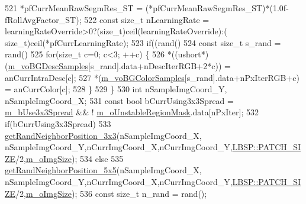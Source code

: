 \begin{DoxyCode}
521                 *pfCurrMeanRawSegmRes\_ST = (*pfCurrMeanRawSegmRes\_ST)*(1.0f-fRollAvgFactor\_ST);
522                 \textcolor{keyword}{const} \textcolor{keywordtype}{size\_t} nLearningRate = learningRateOverride>0?(size\_t)ceil(learningRateOverride):(
      size\_t)ceil(*pfCurrLearningRate);
523                 \textcolor{keywordflow}{if}((rand()%
524                     \textcolor{keyword}{const} \textcolor{keywordtype}{size\_t} s\_rand = rand()%
525                     \textcolor{keywordflow}{for}(\textcolor{keywordtype}{size\_t} c=0; c<3; ++c) \{
526                         *((ushort*)(\mbox{\hyperlink{class_background_subtractor_su_b_s_e_n_s_e_a422cc2f2a25c07efca02087bd6fe3d6d}{m\_voBGDescSamples}}[s\_rand].data+nDescIterRGB+2*c)) = 
      anCurrIntraDesc[c];
527                         *(\mbox{\hyperlink{class_background_subtractor_su_b_s_e_n_s_e_a9d4d4bb930b34745536b9862683bb539}{m\_voBGColorSamples}}[s\_rand].data+nPxIterRGB+c) = anCurrColor[c];
528                     \}
529                 \}
530                 \textcolor{keywordtype}{int} nSampleImgCoord\_Y, nSampleImgCoord\_X;
531                 \textcolor{keyword}{const} \textcolor{keywordtype}{bool} bCurrUsing3x3Spread = \mbox{\hyperlink{class_background_subtractor_su_b_s_e_n_s_e_a1e2e28840e7ca373282607db81b49e12}{m\_bUse3x3Spread}} && !
      \mbox{\hyperlink{class_background_subtractor_su_b_s_e_n_s_e_acfaf4c3c5aedbed8bd302444b4a4f8dd}{m\_oUnstableRegionMask}}.data[nPxIter];
532                 \textcolor{keywordflow}{if}(bCurrUsing3x3Spread)
533                     \mbox{\hyperlink{_rand_utils_8h_a76b18bef397ed044a6db9e3a63c69f69}{getRandNeighborPosition\_3x3}}(nSampleImgCoord\_X,
      nSampleImgCoord\_Y,nCurrImgCoord\_X,nCurrImgCoord\_Y,\mbox{\hyperlink{class_l_b_s_p_aa98abb79a155d3a2b416c2ab32e74929}{LBSP::PATCH\_SIZE}}/2,\mbox{\hyperlink{class_background_subtractor_l_b_s_p_a732d5e6ae35fb0e858cadb3af5ce08a2}{m\_oImgSize}});
534                 \textcolor{keywordflow}{else}
535                     \mbox{\hyperlink{_rand_utils_8h_adb1e7788e9dbe8cfde588761e96126c1}{getRandNeighborPosition\_5x5}}(nSampleImgCoord\_X,
      nSampleImgCoord\_Y,nCurrImgCoord\_X,nCurrImgCoord\_Y,\mbox{\hyperlink{class_l_b_s_p_aa98abb79a155d3a2b416c2ab32e74929}{LBSP::PATCH\_SIZE}}/2,\mbox{\hyperlink{class_background_subtractor_l_b_s_p_a732d5e6ae35fb0e858cadb3af5ce08a2}{m\_oImgSize}});
536                 \textcolor{keyword}{const} \textcolor{keywordtype}{size\_t} n\_rand = rand();

\end{DoxyCode}
